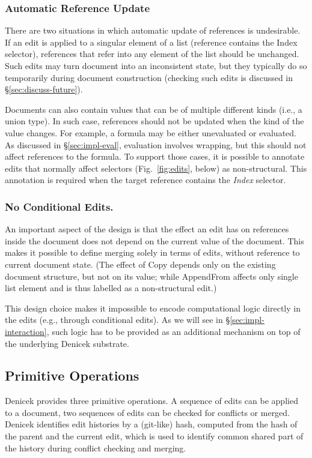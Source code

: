 \documentclass[sigconf,anonymous,screen]{acmart}
\newcommand{\ident}[1]{{\sffamily #1}}
\begin{document}

\subsubsection*{Automatic Reference Update}
There are two situations in which automatic update of references is undesirable. If an edit is
applied to a singular element of a list (reference contains the \ident{Index} selector),
references that refer into any element of the list should be unchanged.  Such edits may turn
document into an inconsistent state, but they typically do so temporarily during document
construction (checking such edits is discussed in \S\ref{sec:discuss-future}).

Documents can also contain values that can be of multiple different kinds (i.e., a union type).
In such case, references should not be updated when the kind of the value changes. For example,
a formula may be either unevaluated or evaluated. As discussed in \S\ref{sec:impl-eval}, evaluation
involves wrapping, but this should not affect references to the formula.
To support those cases, it is possible to annotate edits that normally affect selectors
(Fig.~\ref{fig:edits}, below) as non-structural. This annotation is required when the
target reference contains the \emph{Index} selector.

\subsubsection*{No Conditional Edits.}
An important aspect of the design is that the effect an edit has on references inside
the document does not depend on the current value of the document. This makes it possible to
define merging solely in terms of edits, without reference to current document state.
(The effect of \ident{Copy} depends only on the existing document structure, but not on its value;
while \ident{AppendFrom} affects only single list element and is thus labelled as a
non-structural edit.)

This design choice makes it impossible to encode computational logic directly in the edits
(e.g., through conditional edits). As we will see in \S\ref{sec:impl-interaction}, such logic
has to be provided as an additional  mechanism on top of the underlying Denicek substrate.

\subsection{Primitive Operations}
\label{sec:system-ops}
Denicek provides three primitive operations. A sequence of edits can be applied to a document, two
sequences of edits can be checked for conflicts or merged. Denicek identifies edit histories by
a (git-like) hash, computed from the hash of the parent and the current edit, which is used to identify
common shared part of the history during conflict checking and merging.
\end{document}
